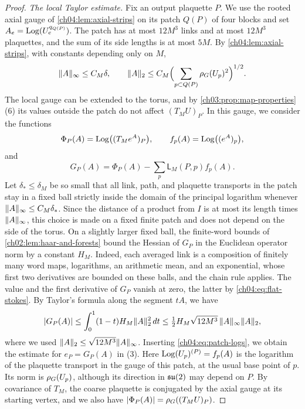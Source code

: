 \begin{proof}
\emph{The local Taylor estimate.} Fix an output plaquette $P$. We use the rooted axial gauge of \cref{ch04:lem:axial-strips} on its patch $Q(P)$ of four blocks and set $A_e=\operatorname{Log}(U_e^{q_{Q(P)}})$. The patch has at most $12M^3$ links and at most $12M^3$ plaquettes, and the sum of its side lengths is at most $5M$. By \cref{ch04:lem:axial-strips}, with constants depending only on $M$,
\begin{equation}\label{ch04:eq:patch-logs}
 \lVert A\rVert_\infty\le C_M\delta,\qquad\lVert A\rVert_2\le C_M\Bigl(\sum_{p\subset Q(P)}\rho_G(U_p)^2\Bigr)^{1/2}.
\end{equation}
The local gauge can be extended to the torus, and by \cref{ch03:prop:map-properties}(6) its values outside the patch do not affect $(T_MU)_P$. In this gauge, we consider the functions
\[
 \Phi_P(A)=\operatorname{Log}\bigl((T_Me^A)_P\bigr),\qquad f_p(A)=\operatorname{Log}\bigl((e^A)_p\bigr),
\]
and
\[
 G_P(A)=\Phi_P(A)-\sum_p\mathsf L_M(P,p)f_p(A).
\]
Let $\delta_*\le\delta_M$ be so small that all link, path, and plaquette transports in the patch stay in a fixed ball strictly inside the domain of the principal logarithm whenever $\lVert A\rVert_\infty\le C_M\delta_*$. Since the distance of a product from $I$ is at most its length times $\lVert A\rVert_\infty$, this choice is made on a fixed finite patch and does not depend on the side of the torus. On a slightly larger fixed ball, the finite-word bounds of \cref{ch02:lem:haar-and-forests} bound the Hessian of $G_P$ in the Euclidean operator norm by a constant $H_M$. Indeed, each averaged link is a composition of finitely many word maps, logarithms, an arithmetic mean, and an exponential, whose first two derivatives are bounded on these balls, and the chain rule applies. The value and the first derivative of $G_P$ vanish at zero, the latter by \eqref{ch04:eq:flat-stokes}. By Taylor's formula along the segment $tA$, we have
\[
 \lvert G_P(A)\rvert\le\int_0^1(1-t)H_M\lVert A\rVert_2^2\,dt\le\tfrac12H_M\sqrt{12M^3}\,\lVert A\rVert_\infty\lVert A\rVert_2,
\]
where we used $\lVert A\rVert_2\le\sqrt{12M^3}\lVert A\rVert_\infty$. Inserting \eqref{ch04:eq:patch-logs}, we obtain the estimate for $e_P=G_P(A)$ in (3). Here $\operatorname{Log}(U_p)^{(P)}=f_p(A)$ is the logarithm of the plaquette transport in the gauge of this patch, at the usual base point of $p$. Its norm is $\rho_G(U_p)$, although its direction in $\mathfrak{su}(2)$ may depend on $P$. By covariance of $T_M$, the coarse plaquette is conjugated by the axial gauge at its starting vertex, and we also have $\lvert \Phi_P(A)\rvert=\rho_G((T_MU)_P)$.


\end{proof}

